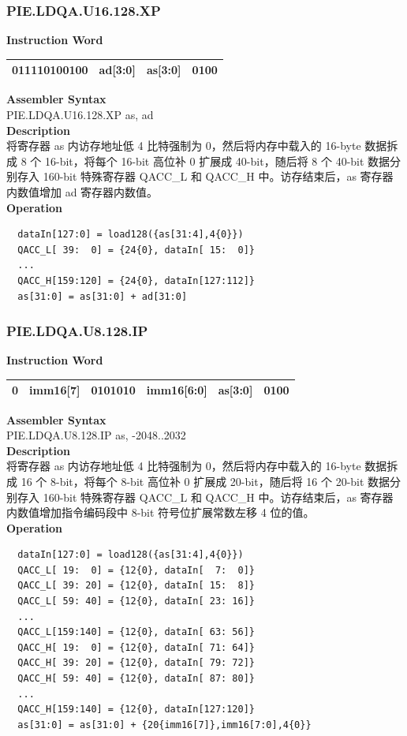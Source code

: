 \newpage
\subsubsection{PIE.LDQA.U16.128.XP}\label{instruction:PIELDQAU16128XP}
\setlength\tabcolsep{6pt}
\textbf{Instruction Word} \\
\begin{tabular}{|c|c|c|c|}
	\hline
	011110100100 & ad[3:0] & as[3:0] & 0100 \\
	\hline
\end{tabular}

\textbf{Assembler Syntax} \\
PIE.LDQA.U16.128.XP as, ad \\
\textbf{Description} \\
将寄存器 as 内访存地址低 4 比特强制为 0，然后将内存中载入的 16-byte 数据拆成 8 个 16-bit，将每个 16-bit 高位补 0 扩展成 40-bit，随后将 8 个 40-bit 数据分别存入 160-bit 特殊寄存器 QACC\_L 和 QACC\_H 中。访存结束后，as 寄存器内数值增加 ad 寄存器内数值。\\
\textbf{Operation}
\begin{lstlisting}
  dataIn[127:0] = load128({as[31:4],4{0}})
  QACC_L[ 39:  0] = {24{0}, dataIn[ 15:  0]}
  ...
  QACC_H[159:120] = {24{0}, dataIn[127:112]}
  as[31:0] = as[31:0] + ad[31:0]
\end{lstlisting}

\newpage
\subsubsection{PIE.LDQA.U8.128.IP}\label{instruction:PIELDQAU8128IP}
\setlength\tabcolsep{6pt}
\textbf{Instruction Word} \\
\begin{tabular}{|c|c|c|c|c|c|}
	\hline
	0 & imm16[7] & 0101010 & imm16[6:0] & as[3:0] & 0100 \\
	\hline
\end{tabular}

\textbf{Assembler Syntax} \\
PIE.LDQA.U8.128.IP as, -2048..2032 \\
\textbf{Description} \\
将寄存器 as 内访存地址低 4 比特强制为 0，然后将内存中载入的 16-byte 数据拆成 16 个 8-bit，将每个 8-bit 高位补 0 扩展成 20-bit，随后将 16 个 20-bit 数据分别存入 160-bit 特殊寄存器 QACC\_L 和 QACC\_H 中。访存结束后，as 寄存器内数值增加指令编码段中 8-bit 符号位扩展常数左移 4 位的值。\\
\textbf{Operation}
\begin{lstlisting}
  dataIn[127:0] = load128({as[31:4],4{0}})
  QACC_L[ 19:  0] = {12{0}, dataIn[  7:  0]}
  QACC_L[ 39: 20] = {12{0}, dataIn[ 15:  8]}
  QACC_L[ 59: 40] = {12{0}, dataIn[ 23: 16]}
  ...
  QACC_L[159:140] = {12{0}, dataIn[ 63: 56]}
  QACC_H[ 19:  0] = {12{0}, dataIn[ 71: 64]}
  QACC_H[ 39: 20] = {12{0}, dataIn[ 79: 72]}
  QACC_H[ 59: 40] = {12{0}, dataIn[ 87: 80]}
  ...
  QACC_H[159:140] = {12{0}, dataIn[127:120]}
  as[31:0] = as[31:0] + {20{imm16[7]},imm16[7:0],4{0}}
\end{lstlisting}

